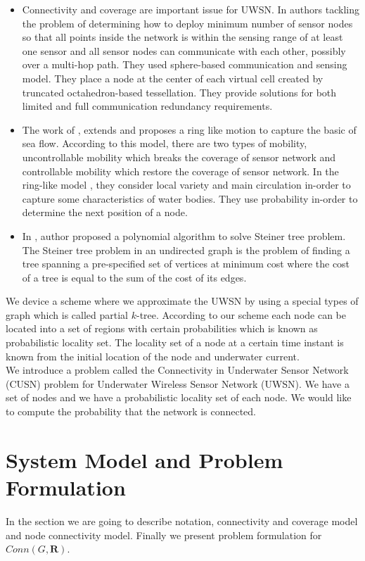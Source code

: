 \documentclass[11pt]{article}
\begin{document}
\begin{itemize}
\item Connectivity and coverage are important issue for UWSN. In \cite{Nazrul2008} authors tackling the problem of determining how to deploy minimum number of sensor nodes so that all points inside the network is within the sensing range of at least one sensor and all sensor nodes can communicate with each other, possibly over a multi-hop path. They used sphere-based communication
and sensing model. They place a node at the center of each virtual cell created by truncated octahedron-based
tessellation. They provide solutions for both
limited and full communication redundancy requirements.


\item The work of \cite{luo2009double}, \cite{luo2012double} extends \cite{caruso2008meandering} and proposes a ring like motion to capture the basic of sea flow. According to this model, there are two types of mobility, uncontrollable mobility which breaks the coverage of sensor network and controllable mobility which restore the coverage of sensor network. In the ring-like model \cite{luo2009double}, they consider local variety and main circulation in-order to capture some characteristics of water bodies. They use probability in-order to determine the next position of a node.

\item In \cite{wald1983steiner}, \cite{wald1983steiner1} author proposed a polynomial algorithm to solve Steiner tree problem. The Steiner tree problem  in an undirected graph is the problem of finding 
a tree spanning a pre-specified set of vertices at minimum cost where the cost of a tree is 
equal to the sum of the cost of its edges.
 \end{itemize}
We device a scheme where we approximate the UWSN by using a special types of graph which is called partial $k$-tree. According to our scheme each node can be located into a set of regions with certain probabilities which is known as probabilistic locality set. The locality set of a node at a certain time instant is known from the initial location of the node and underwater current.\\
 
We introduce a problem called the Connectivity in Underwater Sensor Network (CUSN) problem for Underwater Wireless Sensor Network (UWSN). We have a set of nodes and we have a probabilistic locality set of each node. We would like to compute the probability that the network is connected.
 

\section{System Model and Problem Formulation}
\label{sec:systemmodel}
In the section we are going to describe notation, connectivity and coverage model and node connectivity model. Finally we present problem formulation for $Conn(G,\textbf{R})$.
\end{document}
